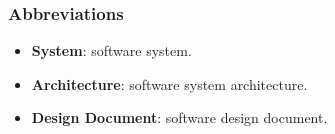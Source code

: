 \subsubsection{Abbreviations}

\begin{itemize}
	\item \textbf{System}: software system.
	\item \textbf{Architecture}: software system architecture.
	\item \textbf{Design Document}: software design document.
\end{itemize}
